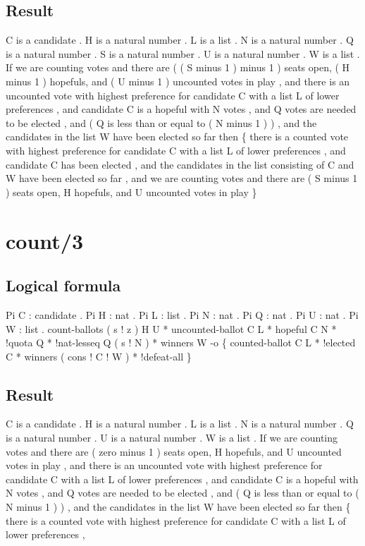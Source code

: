 \subsection{Result}
\begin{texto2}
	C is a candidate . H is a natural number . L is a list . N is a natural number . Q is a natural number . S is a natural number . U is a natural number . W is a list . If we are counting votes and there are ( ( S minus 1 ) minus 1 ) seats open, ( H minus 1 ) hopefuls, and ( U minus 1 ) uncounted votes in play , and there is an uncounted vote with highest preference for candidate C with a list L of lower preferences , and candidate C is a hopeful with N votes , and Q votes are needed to be elected , and ( Q is less than or equal to ( N minus 1 ) ) , and the candidates in the list W have been elected so far then \{ there is a counted vote with highest preference for candidate C with a list L of lower preferences , and candidate C has been elected , and the candidates in the list consisting of C and W have been elected so far , and we are counting votes and there are ( S minus 1 ) seats open, H hopefuls, and U uncounted votes in play \}
\end{texto2}

\section{count/3}
\subsection{Logical formula}
\begin{texto2}
	Pi C : candidate . Pi H : nat . Pi L : list . Pi N : nat . Pi Q : nat . Pi U : nat . Pi W : list . count-ballots ( s ! z ) H U * uncounted-ballot C L * hopeful C N * !quota Q * !nat-lesseq Q ( s ! N ) * winners W -o \{ counted-ballot C L * !elected C * winners ( cons ! C ! W ) * !defeat-all \}
\end{texto2}

\subsection{Result}
\begin{texto2}
	C is a candidate . H is a natural number . L is a list . N is a natural number . Q is a natural number . U is a natural number . W is a list . If we are counting votes and there are ( zero minus 1 ) seats open, H hopefuls, and U uncounted votes in play , and there is an uncounted vote with highest preference for candidate C with a list L of lower preferences , and candidate C is a hopeful with N votes , and Q votes are needed to be elected , and ( Q is less than or equal to ( N minus 1 ) ) , and the candidates in the list W have been elected so far then \{ there is a counted vote with highest preference for candidate C with a list L of lower preferences , 
\end{texto2}

